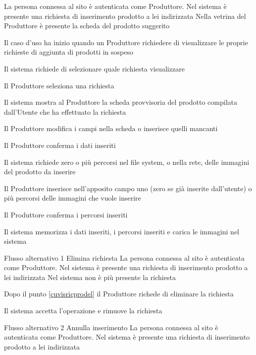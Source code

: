 {}
{La persona connessa al sito è autenticata come Produttore. Nel sistema è presente una richiesta di inserimento prodotto a lei indirizzata}
{Nella vetrina del Produttore è presente la scheda del prodotto suggerito}
{\begin{enumCU}
		\item Il caso d'uso ha inizio quando un Produttore richiedere di visualizzare le proprie richieste di aggiunta di prodotti in sospeso
		\item Il sistema richiede di selezionare quale richiesta visualizzare
		\item Il Produttore seleziona una richiesta
		\item Il sistema mostra al Produttore la scheda provvisoria del prodotto compilata dall'Utente che ha effettuato la richiesta \label{cuvisricprodel}
		\item Il Produttore modifica i campi nella scheda o inserisce quelli mancanti \label{cuvisricpro:1}
		\item Il Produttore conferma i dati inseriti
		\item Il sistema richiede zero o più percorsi nel file system, o nella rete, delle immagini del prodotto da inserire
		\item Il Produttore inserisce nell'apposito campo uno (zero se già inserite dall'utente) o più percorsi delle immagini che vuole inserire \label{cuvisricpro:2}
		\item Il Produttore conferma i percorsi inseriti \label{cuvisricpro:3}
		\item Il sistema memorizza i dati inseriti, i percorsi inseriti e carica le immagini nel sistema
	\end{enumCU}}
%
{Flusso alternativo 1}%
{Elimina richiesta}%
{La persona connessa al sito è autenticata come Produttore. Nel sistema è presente una richiesta di inserimento prodotto a lei indirizzata}
{Nel sistema non è più presente la richiesta}%
{\begin{enumCU}
		\item Dopo il punto \ref{cuvisricprodel} il Produttore richede di eliminare la richiesta
		\item Il sistema accetta l'operazione e rimuove la richiesta
	\end{enumCU}}%
%
{Flusso alternativo 2}%
{Annulla inserimento}%
{La persona connessa al sito è autenticata come Produttore. Nel sistema è presente una richiesta di inserimento prodotto a lei indirizzata}
